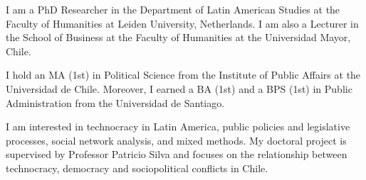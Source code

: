 




\par{I am a PhD Researcher in the Department of Latin American Studies at the Faculty of Humanities at Leiden University, Netherlands. I am also a Lecturer in the School of Business at the Faculty of Humanities at the Universidad Mayor, Chile.

I hold an MA (1st) in Political Science from the Institute of Public Affairs at the Universidad de Chile. Moreover, I earned a BA (1st) and a BPS (1st) in Public Administration from the Universidad de Santiago.

I am interested in technocracy in Latin America, public policies and legislative processes, social network analysis, and mixed methods. My doctoral project is supervised by Professor Patricio Silva and focuses on the relationship between technocracy, democracy and sociopolitical conflicts in Chile.}\\